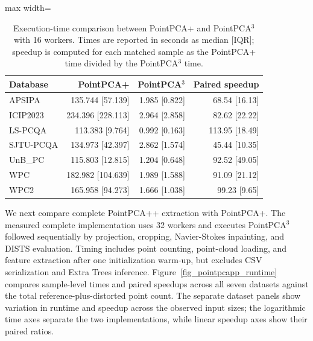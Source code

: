 \documentclass[final,3p,times,twocolumn]{elsarticle}
\begin{document}
\begin{table}[ht!]
    \centering
    \caption{Execution-time comparison between PointPCA+ and PointPCA$^3$ with 16 workers. Times are reported in seconds as median [IQR]; speedup is computed for each matched sample as the PointPCA+ time divided by the PointPCA$^3$ time.}
    \label{tab_pointpca3_runtime}
    \scriptsize
    \begin{adjustbox}{max width=\columnwidth}
    \begin{tabular}{lrrr}
        \toprule
        Database & PointPCA+ & PointPCA$^3$ & Paired speedup \\
        \midrule
        APSIPA & 135.744 [57.139] & 1.985 [0.822] & 68.54 [16.13] \\
        ICIP2023 & 234.396 [228.113] & 2.964 [2.858] & 82.62 [22.22] \\
        LS-PCQA & 113.383 [9.764] & 0.992 [0.163] & 113.95 [18.49] \\
        SJTU-PCQA & 134.973 [42.397] & 2.862 [1.574] & 45.44 [10.35] \\
        UnB\_PC & 115.803 [12.815] & 1.204 [0.648] & 92.52 [49.05] \\
        WPC & 182.982 [104.639] & 1.989 [1.588] & 91.09 [21.12] \\
        WPC2 & 165.958 [94.273] & 1.666 [1.038] & 99.23 [9.65] \\
        \bottomrule
    \end{tabular}
    \end{adjustbox}
\end{table}


We next compare complete PointPCA++ extraction with PointPCA+. The measured complete implementation uses 32 workers and executes PointPCA$^3$ followed sequentially by projection, cropping, Navier-Stokes inpainting, and \gls{DISTS} evaluation. Timing includes point counting, point-cloud loading, and feature extraction after one initialization warm-up, but excludes \gls{CSV} serialization and Extra Trees inference. Figure~\ref{fig_pointpcapp_runtime} compares sample-level times and paired speedups across all seven datasets against the total reference-plus-distorted point count. The separate dataset panels show variation in runtime and speedup across the observed input sizes; the logarithmic time axes separate the two implementations, while linear speedup axes show their paired ratios.
\end{document}
